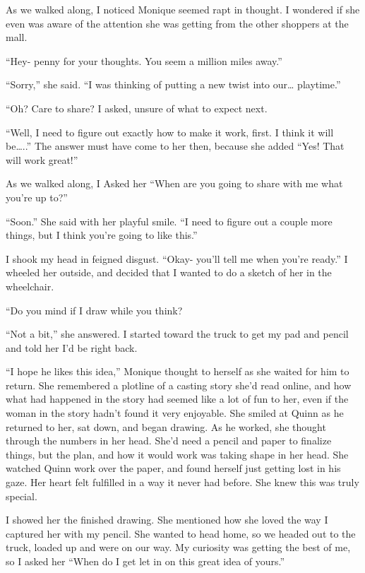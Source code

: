 As we walked along, I noticed Monique seemed rapt in thought. I wondered if she even was
aware of the attention she was getting from the other shoppers at the mall.

``Hey- penny for your thoughts. You seem a million miles away.''

``Sorry,'' she said. ``I was thinking of putting a new twist into our… playtime.''

``Oh? Care to share? I asked, unsure of what to expect next.

``Well, I need to figure out exactly how to make it work, first. I think it will be…..'' The
answer must have come to her then, because she added ``Yes! That will work great!''

As we walked along, I Asked her ``When are you going to share with me what you're up to?''

``Soon.'' She said with her playful smile. ``I need to figure out a couple more things, but I
think you're going to like this.''

I shook my head in feigned disgust. ``Okay- you'll tell me when you're ready.'' I wheeled her
outside, and decided that I wanted to do a sketch of her in the wheelchair.

``Do you mind if I draw while you think?

``Not a bit,'' she answered. I started toward the truck to get my pad and pencil and told her
I'd be right back.

\begin{thought}
``I hope he likes this idea,'' Monique thought to herself as she waited for him to return.
She remembered a plotline of a casting story she'd read online, and how what had happened in the
story had seemed like a lot of fun to her, even if the woman in the story hadn't found it very
enjoyable. She smiled at Quinn as he returned to her, sat down, and began drawing. As he worked,
she thought through the numbers in her head. She'd need a pencil and paper to finalize things,
but the plan, and how it would work was taking shape in her head. She watched Quinn work over
the paper, and found herself just getting lost in his gaze. Her heart felt fulfilled in a way it
never had before. She knew this was truly special.
\end{thought}

I showed her the finished drawing. She mentioned how she loved the way I captured her with
my pencil. She wanted to head home, so we headed out to the truck, loaded up and were on our
way. My curiosity was getting the best of me, so I asked her ``When do I get let in on this
great
idea of yours.''

